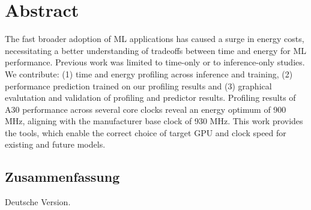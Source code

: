 \begingroup
\let\clearpage\relax
\let\cleardoublepage\relax
\let\cleardoublepage\relax


\chapter*{Abstract}




The fast broader adoption of ML applications has caused a surge in energy costs, necessitating a better understanding of tradeoffs between time and energy for ML performance. Previous work was limited to time-only or to inference-only studies. We contribute: (1) time and energy profiling across inference and training, (2) performance prediction trained on our profiling results and (3) graphical evalutation and validation of profiling and predictor results. Profiling results of A30 performance across several core clocks reveal an energy optimum of 900 MHz, aligning with the manufacturer base clock of 930 MHz. This work provides the tools, which enable the correct choice of target GPU and clock speed for existing and future models.


\newpage


\begin{otherlanguage}{ngerman}
\chapter*{Zusammenfassung}

Deutsche Version.
\lipsum[1]

\end{otherlanguage}

\endgroup

\vfill
